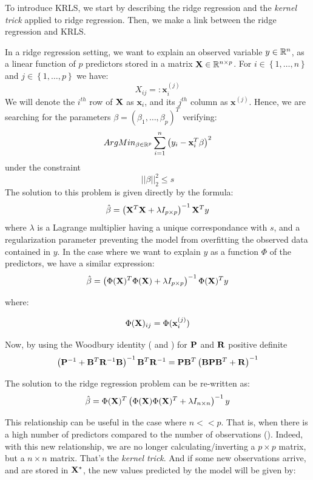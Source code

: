 To introduce KRLS, we start by describing the ridge regression \cite{hoerl1970ridge} and the {\it kernel trick} applied to ridge regression. Then, we make a link between the ridge regression and KRLS. 

In a ridge regression setting, we want to explain an observed variable $y \in \mathbb{R}^n$, as a linear function of $p$ predictors stored in a matrix ${\bf X} \in \mathbb{R}^{n \times p}$. For $i \in \left \lbrace 1, \ldots, n \right \rbrace $ and $j \in \left \lbrace1, \ldots, p \right \rbrace$ we have:
$$
X_{ij} =: \textbf{x}_i^{(j)}
$$
We will denote the $i^{th}$ row of ${\bf X}$ as $\textbf{x}_i$, and its $j^{th}$ column as $\textbf{x}^{(j)}$. Hence, we are searching for the parameters $\beta = \left(\beta_1, \ldots, \beta_p \right)^T$ verifying:
$$
ArgMin_{\beta \in \mathbb{R}^p} \sum_{i = 1}^n \left( y_i - \textbf{x}_i^T {\bf \beta} \right)^2
$$
under the constraint
$$
||\beta ||^2_2 \leq s
$$
The solution to this problem is given directly by the formula:
$$
\hat{\beta} = \left( {\bf X}^T {\bf X} + \lambda I_{p \times p} \right)^{-1}{\bf X}^T y
$$
where $\lambda$ is a Lagrange multiplier having a unique correspondance with $s$, and a regularization parameter preventing the model from overfitting the observed data contained in $y$. In the case where we want to explain $y$ as a function $\Phi$ of the predictors, we have a similar expression:
$$
\hat{\beta} = \left( \Phi({\bf X})^T \Phi({\bf X}) + \lambda I_{p \times p} \right)^{-1}\Phi({\bf X})^T y
$$

where:

$$
\Phi({\bf X})_{ij} = \Phi(\textbf{x}_i^{(j)})
$$

\medskip

Now, by using the Woodbury identity (\cite{golub2012matrix} and \cite{welling2010kalman}) for ${\bf P}$ and ${\bf R}$ positive definite
$$
\left({\bf P}^{-1} + {\bf B}^T {\bf R}^{-1} {\bf B} \right)^{-1}{\bf B}^T {\bf R}^{-1} =
{\bf P}{\bf B}^T \left( {\bf B} {\bf P} {\bf B}^T + {\bf R}\right)^{-1}
$$

The solution to the ridge regression problem can be re-written as:
$$
\hat{\beta} = \Phi({\bf X})^T \left( \Phi({\bf X})\Phi({\bf X})^T + \lambda I_{n \times n} \right)^{-1} y
$$

This relationship can be useful in the case where $n << p$. That is, when there is a high number of predictors compared to the number of observations (\cite{exterkate2016nonlinear}). Indeed, with this new relationship, we are no longer calculating/inverting a $p \times p$ matrix, but a $n \times n$ matrix. That's the {\it kernel trick}. And if some new observations arrive, and are stored in ${\bf X^*}$, the new values predicted by the model will be given by:


